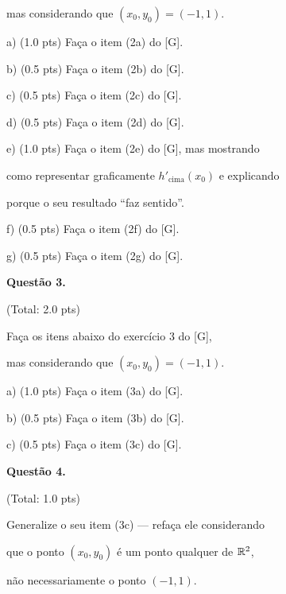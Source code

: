 \documentclass[oneside,12pt]{article}
\begin{document}
mas considerando que $(x_0,y_0) = (-1,1)$.

\msk

a) \B(1.0 pts) Faça o item (2a) do [G].

b) \B(0.5 pts) Faça o item (2b) do [G].

c) \B(0.5 pts) Faça o item (2c) do [G].

d) \B(0.5 pts) Faça o item (2d) do [G].

\msk

e) \B(1.0 pts) Faça o item (2e) do [G], mas mostrando

como representar graficamente $h'_\text{cima}(x_0)$ e explicando

porque o seu resultado ``faz sentido''.

\msk

f) \B(0.5 pts) Faça o item (2f) do [G].

g) \B(0.5 pts) Faça o item (2g) do [G].


\newpage


{\bf Questão 3.}

\T(Total: 2.0 pts)

\ssk

Faça os itens abaixo do exercício 3 do [G],

mas considerando que $(x_0,y_0) = (-1,1)$.

\msk

a) \B(1.0 pts) Faça o item (3a) do [G].

b) \B(0.5 pts) Faça o item (3b) do [G].

c) \B(0.5 pts) Faça o item (3c) do [G].


\newpage


{\bf Questão 4.}

\T(Total: 1.0 pts)

\ssk

Generalize o seu item (3c) --- refaça ele considerando

que o ponto $(x_0,y_0)$ é um ponto qualquer de $\mathbb{R}^2$,

não necessariamente o ponto $(-1,1)$.



\newpage

\end{document}
